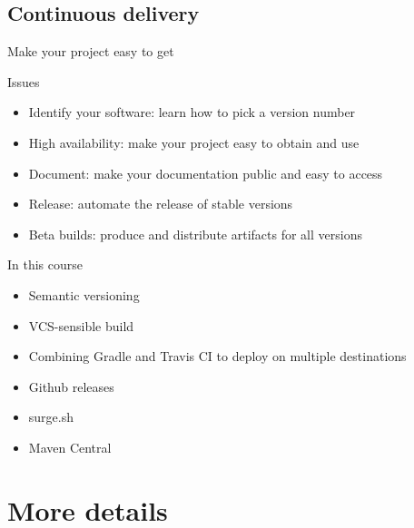 \documentclass[presentation]{beamer}
\begin{document}
\subsection{Continuous delivery}

\begin{frame}{Make your project easy to get}
    \begin{block}{Issues}
        \begin{itemize}
            \item Identify your software: learn how to pick a version number
            \item High availability: make your project easy to obtain and use
            \item Document: make your documentation public and easy to access
            \item Release: automate the release of stable versions
            \item Beta builds: produce and distribute artifacts for all versions
        \end{itemize}
    \end{block}
    \begin{block}{In this course}
        \begin{itemize}
            \item Semantic versioning
            \item VCS-sensible build
            \item Combining Gradle and Travis CI to deploy on multiple destinations
            \item Github releases
            \item surge.sh
            \item Maven Central
        \end{itemize}
    \end{block}
\end{frame}

\section{More details}
\end{document}
